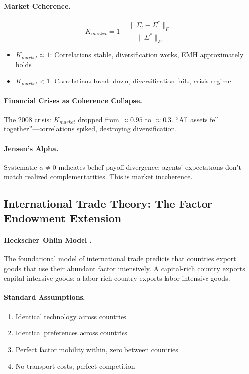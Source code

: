 \paragraph{Market Coherence.}
\begin{equation}
  K_{market} = 1 - \frac{\|\Sigma_t - \Sigma^*\|_F}{\|\Sigma^*\|_F}
\end{equation}

\begin{itemize}
  \item $K_{market} \approx 1$: Correlations stable, diversification works, EMH approximately holds
  \item $K_{market} < 1$: Correlations break down, diversification fails, crisis regime
\end{itemize}

\paragraph{Financial Crises as Coherence Collapse.}
The 2008 crisis: $K_{market}$ dropped from $\approx 0.95$ to $\approx 0.3$.
``All assets fell together''---correlations spiked, destroying diversification.

\paragraph{Jensen's Alpha.}
Systematic $\alpha \neq 0$ indicates belief-payoff divergence:
agents' expectations don't match realized complementarities.
This is market incoherence.

\subsection{International Trade Theory: The Factor Endowment Extension}

\paragraph{Heckscher--Ohlin Model \citep{heckscher1919,ohlin1933}.}
The foundational model of international trade predicts that countries export goods
that use their abundant factor intensively. A capital-rich country exports
capital-intensive goods; a labor-rich country exports labor-intensive goods.

\paragraph{Standard Assumptions.}
\begin{enumerate}
  \item Identical technology across countries
  \item Identical preferences across countries
  \item Perfect factor mobility within, zero between countries
  \item No transport costs, perfect competition
\end{enumerate}

